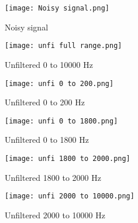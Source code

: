 \documentclass[11pt,a4]{report}
\begin{document}
\begin{figure}[h!]
    \begin{center}
  \caption{Noisy signal}
  \texttt{[image: Noisy signal.png]}
\end{center}
\end{figure}

\newpage

\begin{figure}[h!]
    \begin{center}
  \caption{Unfiltered 0 to 10000 Hz}
  \texttt{[image: unfi full range.png]}
\end{center}
\end{figure}

\begin{figure}[h!]
    \begin{center}
  \caption{Unfiltered 0 to 200 Hz}
  \texttt{[image: unfi 0 to 200.png]}
\end{center}
\end{figure}
\newpage

\begin{figure}[h!]
    \begin{center}
  \caption{Unfiltered 0 to 1800 Hz}
  \texttt{[image: unfi 0 to 1800.png]}
\end{center}
\end{figure}

\begin{figure}[h!]
    \begin{center}
  \caption{Unfiltered 1800 to 2000 Hz}
  \texttt{[image: unfi 1800 to 2000.png]}
\end{center}
\end{figure}
\newpage

\begin{figure}[h!]
    \begin{center}
  \caption{Unfiltered 2000 to 10000 Hz}
  \texttt{[image: unfi 2000 to 10000.png]}
\end{center}
\end{figure}
\end{document}
